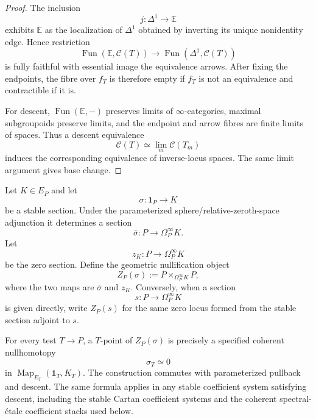 \begin{proof}
The inclusion
\[
j:\Delta^1\longrightarrow\mathbb E
\]
exhibits $\mathbb E$ as the localization of $\Delta^1$ obtained by inverting its
unique nonidentity edge.  Hence restriction
\[
\operatorname{Fun}(\mathbb E,\mathcal C(T))
\longrightarrow
\operatorname{Fun}(\Delta^1,\mathcal C(T))
\]
is fully faithful with essential image the equivalence arrows.  After fixing the
endpoints, the fibre over $f_T$ is therefore empty if $f_T$ is not an equivalence
and contractible if it is.

For descent, $\operatorname{Fun}(\mathbb E,-)$ preserves limits of
$\infty$-categories, maximal subgroupoids preserve limits, and the endpoint and
arrow fibres are finite limits of spaces.  Thus a descent equivalence
\[
\mathcal C(T)\simeq\lim_m\mathcal C(T_m)
\]
induces the corresponding equivalence of inverse-locus spaces.  The same
limit argument gives base change.
\end{proof}

\begin{construction}
\label{constr:symmetry-noether-parameterized-zero-locus-of-a-stable-section}
Let $K\in E_P$ and let
\[
\sigma:\mathbf1_P\longrightarrow K
\]
be a stable section.  Under the parameterized sphere/relative-zeroth-space
adjunction it determines a section
\[
\bar\sigma:P\longrightarrow\Omega_P^\infty K.
\]
Let
\[
z_K:P\longrightarrow\Omega_P^\infty K
\]
be the zero section.  Define the geometric nullification object
\[
\boxed{
Z_P(\sigma)
:=
P\times_{\Omega_P^\infty K}P,
}
\]
where the two maps are $\bar\sigma$ and $z_K$.  Conversely, when a
section
\[
s:P\longrightarrow\Omega_P^\infty K
\]
is given directly, write $Z_P(s)$ for the same zero locus formed from the stable
section adjoint to $s$.
\end{construction}

\begin{lemma}
\label{lem:symmetry-noether-recognition-of-stable-nullification}
For every test $T\to P$, a $T$-point of $Z_P(\sigma)$ is precisely a specified
coherent nullhomotopy
\[
\sigma_T\simeq0
\]
in
$\operatorname{Map}_{E_T}(\mathbf1_T,K_T)$.  The construction commutes with
parameterized pullback and descent.  The same formula applies in any stable
coefficient system satisfying descent, including the stable Cartan coefficient
systems and the coherent spectral-\'etale coefficient stacks used below.
\end{lemma}

